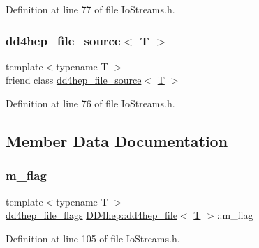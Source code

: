 Definition at line 77 of file Io\+Streams.\+h.

\hypertarget{class_d_d4hep_1_1dd4hep__file_a6b3fcc7f94c708f7b47316d1ac4b1cf4}{}\label{class_d_d4hep_1_1dd4hep__file_a6b3fcc7f94c708f7b47316d1ac4b1cf4} 
\subsubsection{\texorpdfstring{dd4hep\+\_\+file\+\_\+source$<$ T $>$}{dd4hep\_file\_source< T >}}
{\footnotesize\ttfamily template$<$typename T $>$ \\
friend class \hyperlink{class_d_d4hep_1_1dd4hep__file__source}{dd4hep\+\_\+file\+\_\+source}$<$ \hyperlink{class_t}{T} $>$\hspace{0.3cm}{\ttfamily [friend]}}



Definition at line 76 of file Io\+Streams.\+h.



\subsection{Member Data Documentation}
\hypertarget{class_d_d4hep_1_1dd4hep__file_ae278513f83e549eda9cf0e01998a6726}{}\label{class_d_d4hep_1_1dd4hep__file_ae278513f83e549eda9cf0e01998a6726} 
\subsubsection{\texorpdfstring{m\+\_\+flag}{m\_flag}}
{\footnotesize\ttfamily template$<$typename T $>$ \\
\hyperlink{namespace_d_d4hep_a31d19f9b0ce567067d2897fbda1761e5}{dd4hep\+\_\+file\+\_\+flags} \hyperlink{class_d_d4hep_1_1dd4hep__file}{D\+D4hep\+::dd4hep\+\_\+file}$<$ \hyperlink{class_t}{T} $>$\+::m\+\_\+flag\hspace{0.3cm}{\ttfamily [private]}}



Definition at line 105 of file Io\+Streams.\+h.

\hypertarget{class_d_d4hep_1_1dd4hep__file_a198f202b4b952426543a8df41a21a232}{}\label{class_d_d4hep_1_1dd4hep__file_a198f202b4b952426543a8df41a21a232} 
